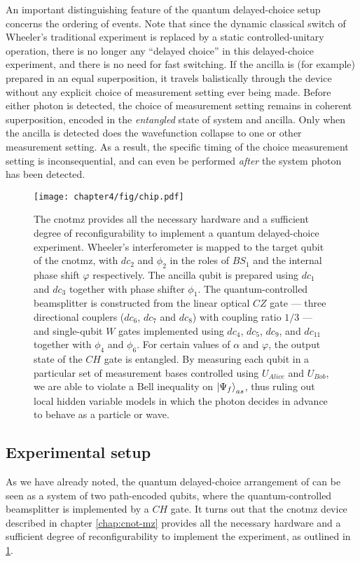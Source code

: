 An important distinguishing feature of the quantum delayed-choice setup concerns the ordering of events. Note that since the dynamic classical switch of Wheeler's traditional experiment is replaced by a static controlled-unitary operation, there is no longer any ``delayed choice'' in this delayed-choice experiment, and there is no need for fast switching. If the ancilla is (for example) prepared in an equal superposition, it travels balistically through the device without any explicit choice of measurement setting ever being made. Before either photon is detected, the choice of measurement setting remains in coherent superposition, encoded in the \emph{entangled} state of system and ancilla. Only when the ancilla is detected does the wavefunction collapse to one or other measurement setting. As a result, the specific timing of the choice measurement setting is inconsequential, and can even be performed \emph{after} the system photon has been detected.

\begin{figure}[t]
\centering
\texttt{[image: chapter4/fig/chip.pdf]}
\caption[Quantum delayed-choice experiment: experimental setup]
{
The \acrshort{cnotmz} provides all the necessary hardware and a sufficient degree of reconfigurability to implement a quantum delayed-choice experiment. Wheeler's interferometer is mapped to  the target qubit of the \acrshort{cnotmz}, with $dc_2$ and $\phi_2$ in the roles of $BS_1$ and the internal phase shift $\varphi$
respectively. The ancilla qubit is prepared using $dc_1$ and $dc_3$ together with phase shifter $\phi_1$. The quantum-controlled beamsplitter is constructed from the linear optical $CZ$ gate --- three directional couplers ($dc_6$, $dc_7$ and $dc_8$) with coupling ratio $1/3$ --- and single-qubit $W$ gates implemented using $dc_4$, $dc_5$, $dc_{9}$, and $dc_{11}$ together with $\phi_4$ and $\phi_6$.
For certain values of $\alpha$ and $\varphi$, the output state of the $CH$ gate is entangled. By measuring each qubit in a particular set of measurement bases controlled using $U_{Alice}$ and $U_{Bob}$, we are able to violate a Bell inequality on $\mbox{$ | \Psi_f \rangle $}_{as}$, thus ruling out local hidden variable models in which the photon decides in advance to behave as a particle or wave.}
\label{fig:delayed-choice-chip}
\end{figure}


\subsection{Experimental setup} 
As we have already noted, the quantum delayed-choice arrangement of \cite{Ionicioiu2011c} can be seen as a system of two path-encoded qubits, where the quantum-controlled beamsplitter is implemented by a $CH$ gate. It turns out that the \acrshort{cnotmz} device described in chapter \ref{chap:cnot-mz} provides all the necessary hardware and a sufficient degree of reconfigurability to implement the experiment, as outlined in \ref{fig:delayed-choice-chip}.


